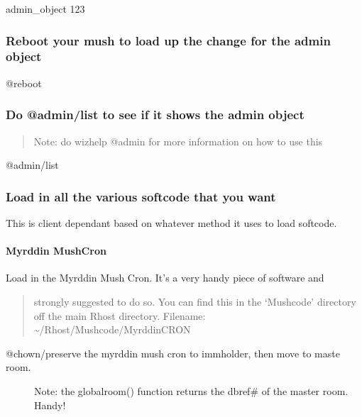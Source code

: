 \documentclass[letterpaper,10pt,english]{sphinxmanual}
\begin{document}
\sphinxAtStartPar
admin\_object 123


\subsubsection{Reboot your mush to load up the change for the admin object}
\label{\detokenize{gettingstarted:reboot-your-mush-to-load-up-the-change-for-the-admin-object}}
\sphinxAtStartPar
@reboot


\subsubsection{Do @admin/list to see if it shows the admin object}
\label{\detokenize{gettingstarted:do-admin-list-to-see-if-it-shows-the-admin-object}}\begin{quote}

\sphinxAtStartPar
Note: do wizhelp @admin for more information on how to use this
\end{quote}

\sphinxAtStartPar
@admin/list


\subsubsection{Load in all the various softcode that you want}
\label{\detokenize{gettingstarted:load-in-all-the-various-softcode-that-you-want}}
\sphinxAtStartPar
This is client dependant based on whatever method it uses to load softcode.


\paragraph{Myrddin MushCron}
\label{\detokenize{gettingstarted:myrddin-mushcron}}
\sphinxAtStartPar
Load in the Myrddin Mush Cron.
It’s a very handy piece of software and
\begin{quote}

\sphinxAtStartPar
strongly suggested to do so.  You can find this in the ‘Mushcode’ directory
off the main Rhost directory.
Filename: \textasciitilde{}/Rhost/Mushcode/MyrddinCRON
\end{quote}
\begin{description}
\item[{@chown/preserve the myrddin mush cron to immholder, then move to maste room.}] \leavevmode
\sphinxAtStartPar
Note: the globalroom() function returns the dbref\# of the master room.  Handy!

\end{description}
\end{document}
